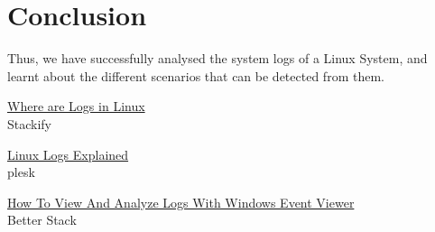 \documentclass[11pt]{article}
\begin{document}
% 

\section{Conclusion}
Thus, we have successfully analysed the system logs of a Linux System, and learnt about the different scenarios that can be detected from them.
\clearpage

\pagebreak
\begin{thebibliography}{}
    \href{https://stackify.com/linux-logs/#:~:text=Linux%20log%20files%20are%20stored,%2C%20Apache%2C%20MySQL%2C%20etc.}{Where are Logs in Linux}\\
    Stackify

    \href{https://www.plesk.com/blog/featured/linux-logs-explained/}{Linux Logs Explained} \\plesk

    \href{https://betterstack.com/community/guides/logging/how-to-view-and-analyze-logs-with-windows-event-viewer/}{How To View And Analyze Logs With Windows Event Viewer} \\Better Stack
\end{thebibliography}
\end{document}
